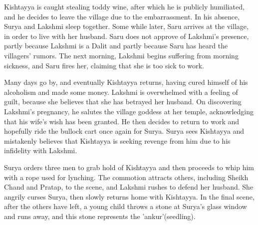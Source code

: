 \documentclass{article}
\begin{document}
Kishtayya is caught stealing toddy wine, after which he is publicly humiliated, and he decides to leave the village due to the embarrassment. In his absence, Surya and Lakshmi sleep together. Some while later, Saru arrives at the village, in order to live with her husband. Saru does not approve of Lakshmi's presence, partly because Lakshmi is a Dalit and partly because Saru has heard the villagers' rumors. The next morning, Lakshmi begins suffering from morning sickness, and Saru fires her, claiming that she is too sick to work.

Many days go by, and eventually Kishtayya returns, having cured himself of his alcoholism and made some money. Lakshmi is overwhelmed with a feeling of guilt, because she believes that she has betrayed her husband. On discovering Lakshmi's pregnancy, he salutes the village goddess at her temple, acknowledging that his wife's wish has been granted. He then decides to return to work and hopefully ride the bullock cart once again for Surya. Surya sees Kishtayya and mistakenly believes that Kishtayya is seeking revenge from him due to his infidelity with Lakshmi.

Surya orders three men to grab hold of Kishtayya and then proceeds to whip him with a rope used for lynching. The commotion attracts others, including Sheikh Chand and Pratap, to the scene, and Lakshmi rushes to defend her husband. She angrily curses Surya, then slowly returns home with Kishtayya. In the final scene, after the others have left, a young child throws a stone at Surya's glass window and runs away, and this stone represents the 'ankur'(seedling).
\end{document}
